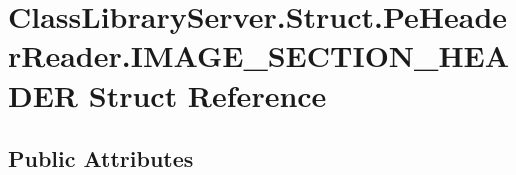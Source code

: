 \hypertarget{struct_class_library_server_1_1_struct_1_1_pe_header_reader_1_1_i_m_a_g_e___s_e_c_t_i_o_n___h_e_a_d_e_r}{}\section{Class\+Library\+Server.\+Struct.\+Pe\+Header\+Reader.\+I\+M\+A\+G\+E\+\_\+\+S\+E\+C\+T\+I\+O\+N\+\_\+\+H\+E\+A\+D\+ER Struct Reference}
\label{struct_class_library_server_1_1_struct_1_1_pe_header_reader_1_1_i_m_a_g_e___s_e_c_t_i_o_n___h_e_a_d_e_r}
\subsection*{Public Attributes}
